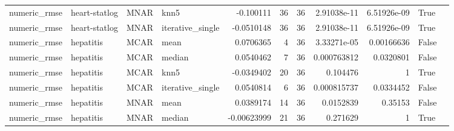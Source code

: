 \begin{table}[ht]
\begin{tabular}{llllrrrrrll}
 numeric\_rmse           & heart-statlog        & MNAR        & knn5             &     -0.100111    &                  36 &      36 & 2.91038e-11 & 6.51926e-09 & True               &                                                                                                                    \\
 numeric\_rmse           & heart-statlog        & MNAR        & iterative\_single &     -0.0510148   &                  36 &      36 & 2.91038e-11 & 6.51926e-09 & True               &                                                                                                                    \\
 numeric\_rmse           & hepatitis            & MCAR        & mean             &      0.0706365   &                   4 &      36 & 3.33271e-05 & 0.00166636  & False              &                                                                                                                    \\
 numeric\_rmse           & hepatitis            & MCAR        & median           &      0.0540462   &                   7 &      36 & 0.000763812 & 0.0320801   & False              &                                                                                                                    \\
 numeric\_rmse           & hepatitis            & MCAR        & knn5             &     -0.0349402   &                  20 &      36 & 0.104476    & 1           & True               &                                                                                                                    \\
 numeric\_rmse           & hepatitis            & MCAR        & iterative\_single &      0.0540814   &                   6 &      36 & 0.000815737 & 0.0334452   & False              &                                                                                                                    \\
 numeric\_rmse           & hepatitis            & MNAR        & mean             &      0.0389174   &                  14 &      36 & 0.0152839   & 0.35153     & False              &                                                                                                                    \\
 numeric\_rmse           & hepatitis            & MNAR        & median           &     -0.00623999  &                  21 &      36 & 0.271629    & 1           & True               &                                                                                                                    \\

\end{tabular}
\end{table}
